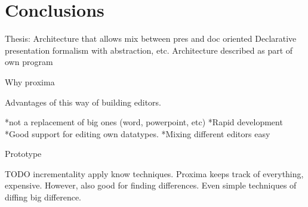 \chapter{Conclusions}
\label{chap:conclusions}


Thesis:
Architecture that allows mix between pres and doc oriented
Declarative presentation formalism with abstraction, etc.
Architecture described as part of own program

Why proxima

Advantages of this way of building editors.

*not a replacement of big ones (word, powerpoint, etc)
*Rapid development
*Good support for editing own datatypes.
*Mixing different editors easy

Prototype

TODO
incrementality
apply know techniques.
Proxima keeps track of everything, expensive. However, also good for finding differences. Even simple techniques of diffing big difference.